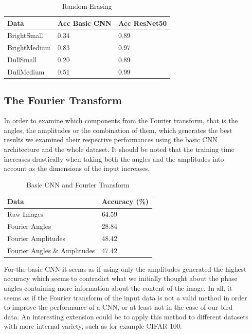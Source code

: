 \documentclass{article}
\begin{document}
\begin{table}[H]
	\caption{Random Erasing }
	\label{sample-table}
	\centering
	\begin{tabular}{lll}
		
		\toprule
		Data & Acc Basic CNN & Acc ResNet50 \\
		\midrule
		
		BrightSmall   & 0.34 & 0.89  \\
		BrightMedium  & 0.83 & 0.97  \\
		DullSmall     & 0.20 & 0.89  \\
		DullMedium    & 0.51 & 0.99  \\
		\bottomrule
	\end{tabular}
\end{table}



\subsection{The Fourier Transform}

In order to examine which components from the Fourier transform, that is the angles, the amplitudes or the combination of them, which generates the best results we examined their respective performances using the basic CNN architecture and the whole dataset. It should be noted that the training time increases drastically when taking both the angles and the amplitudes into account as the dimensions of the input increases.

\begin{table}[H]
  \caption{Basic CNN and Fourier Transform}
  \label{sample-table}
  \centering
  \begin{tabular}{ll}
    \toprule
    Data & Accuracy (\%) \\
    \midrule
    Raw Images  & 64.59 \\
    Fourier Angles & 28.84   \\
    Fourier Amplitudes & 48.42 \\
    Fourier Angles \& Amplitudes & 47.42 \\
    \bottomrule
  \end{tabular}
\end{table}

For the basic CNN it seems as if using only the amplitudes generated the highest accuracy which seems to contradict what we initially thought about the phase angles containing more information about the content of the image. In all, it seems as if the Fourier transform of the input data is not a valid method in order to improve the performance of a CNN, or at least not in the case of our bird data. An interesting extension could be to apply this method to different datasets with more internal variety, such as for example CIFAR 100.
\end{document}
